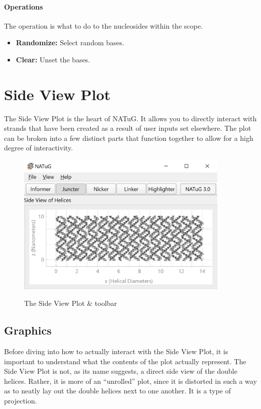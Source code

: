 \documentclass[titlepage]{article}
\begin{document}
\paragraph{Operations}
The operation is what to do to the nucleosides within the scope.

\begin{itemize}
	\item \textbf{Randomize:} Select random bases.
	\item \textbf{Clear:} Unset the bases.
\end{itemize}

\section{Side View Plot}
The Side View Plot is the heart of NATuG. It allows you to directly interact with strands that have been created as a result of user inputs set elsewhere. The plot can be broken into a few distinct parts that function together to allow for a high degree of interactivity. 

\begin{figure}[h]
	\centering
	\caption{The Side View Plot \& toolbar}
	\includegraphics[width=4in]{short-side-view-overview.png}
	\label{fig:short-side-view-overview}
\end{figure}

\subsection{Graphics}
Before diving into how to actually interact with the Side View Plot, it is important to understand what the contents of the plot actually represent. The Side View Plot is not, as its name suggests, a direct side view of the double helices. Rather, it is more of an ``unrolled'' plot, since it is distorted in such a way as to neatly lay out the double helices next to one another. It is a type of projection.
\end{document}

